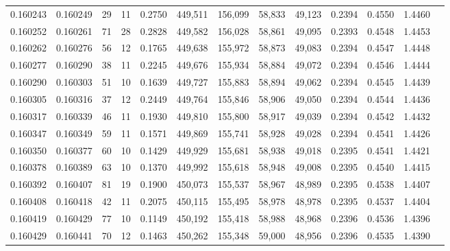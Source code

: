 \begin{tabular}{rrrrrrrrrrrrr}
0.160243 & 0.160249 &    29 &  11 &                                     0.2750 & 449,511 & 156,099 &  58,833 &  49,123 & 0.2394 & 0.4550 & 1.4460 \\
0.160252 & 0.160261 &    71 &  28 &                                     0.2828 & 449,582 & 156,028 &  58,861 &  49,095 & 0.2393 & 0.4548 & 1.4453 \\
0.160262 & 0.160276 &    56 &  12 &                                     0.1765 & 449,638 & 155,972 &  58,873 &  49,083 & 0.2394 & 0.4547 & 1.4448 \\
0.160277 & 0.160290 &    38 &  11 &                                     0.2245 & 449,676 & 155,934 &  58,884 &  49,072 & 0.2394 & 0.4546 & 1.4444 \\
0.160290 & 0.160303 &    51 &  10 &                                     0.1639 & 449,727 & 155,883 &  58,894 &  49,062 & 0.2394 & 0.4545 & 1.4439 \\
0.160305 & 0.160316 &    37 &  12 &                                     0.2449 & 449,764 & 155,846 &  58,906 &  49,050 & 0.2394 & 0.4544 & 1.4436 \\
0.160317 & 0.160339 &    46 &  11 &                                     0.1930 & 449,810 & 155,800 &  58,917 &  49,039 & 0.2394 & 0.4542 & 1.4432 \\
0.160347 & 0.160349 &    59 &  11 &                                     0.1571 & 449,869 & 155,741 &  58,928 &  49,028 & 0.2394 & 0.4541 & 1.4426 \\
0.160350 & 0.160377 &    60 &  10 &                                     0.1429 & 449,929 & 155,681 &  58,938 &  49,018 & 0.2395 & 0.4541 & 1.4421 \\
0.160378 & 0.160389 &    63 &  10 &                                     0.1370 & 449,992 & 155,618 &  58,948 &  49,008 & 0.2395 & 0.4540 & 1.4415 \\
0.160392 & 0.160407 &    81 &  19 &                                     0.1900 & 450,073 & 155,537 &  58,967 &  48,989 & 0.2395 & 0.4538 & 1.4407 \\
0.160408 & 0.160418 &    42 &  11 &                                     0.2075 & 450,115 & 155,495 &  58,978 &  48,978 & 0.2395 & 0.4537 & 1.4404 \\
0.160419 & 0.160429 &    77 &  10 &                                     0.1149 & 450,192 & 155,418 &  58,988 &  48,968 & 0.2396 & 0.4536 & 1.4396 \\
0.160429 & 0.160441 &    70 &  12 &                                     0.1463 & 450,262 & 155,348 &  59,000 &  48,956 & 0.2396 & 0.4535 & 1.4390 \\

\end{tabular}
